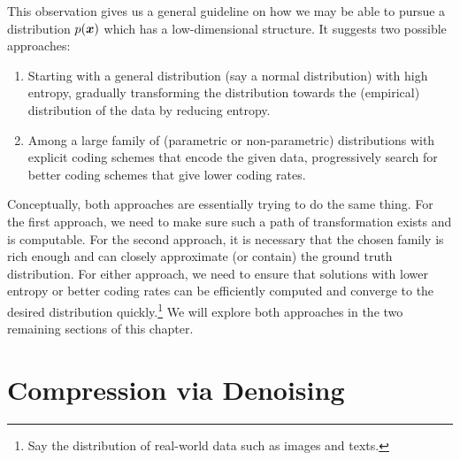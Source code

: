 \documentclass[../../book-main.tex]{subfiles}
\begin{document}
This observation gives us a general guideline on how we may be able to pursue a distribution $p(\bm{x})$ which has a low-dimensional structure. It suggests two possible approaches:
\begin{enumerate}
	\item Starting with a general distribution (say a normal distribution) with high entropy, gradually transforming the distribution towards the (empirical) distribution of the data by reducing entropy.
	\item Among a large family of (parametric or non-parametric) distributions with explicit coding schemes that encode the given data, progressively search for better coding schemes that give lower coding rates.
\end{enumerate}
Conceptually, both approaches are essentially trying to do the same thing. For the first approach, we need to make sure such a path of transformation exists and is computable. For the second approach, it is necessary that the chosen family is rich enough and can closely approximate (or contain) the ground truth distribution. For either approach, we need to ensure that solutions with lower entropy or better coding rates can be efficiently computed and converge to the desired distribution quickly.\footnote{Say the distribution of real-world data such as images and texts.} We will explore both approaches in the two remaining sections of this chapter.  %

\section{Compression via Denoising}\label{sub:compression_denoising}
\end{document}
